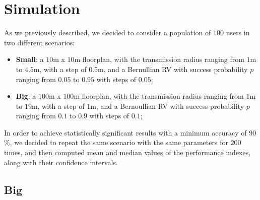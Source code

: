 %
\chapter{Simulation}\label{simulation}
As we previously described, we decided to consider a population of $100$ users
in two different scenarios:
\begin{itemize}
    \item \textbf{Small}: a $10$m x $10$m floorplan, with the transmission
    radius ranging from $1$m to $4.5$m, with a step of $0.5$m, and a Bernullian
    RV with success probability $p$ ranging from $0.05$ to $0.95$ with steps of
    $0.05$;
    \item \textbf{Big}: a $100$m x $100$m floorplan, with the transmission
    radius ranging from $1$m to $19$m, with a step of $1$m, and a Bernoullian RV
    with success probability $p$ ranging from $0.1$ to $0.9$ with steps of $0.1$;
\end{itemize}
In order to achieve statistically significant results with a minimum accuracy of
$90$\%, we decided to repeat the same scenario with the same parameters for
$200$ times, and then computed mean and median values of the performance
indexes, along with their confidence intervals.
\section{Big}\label{big}
